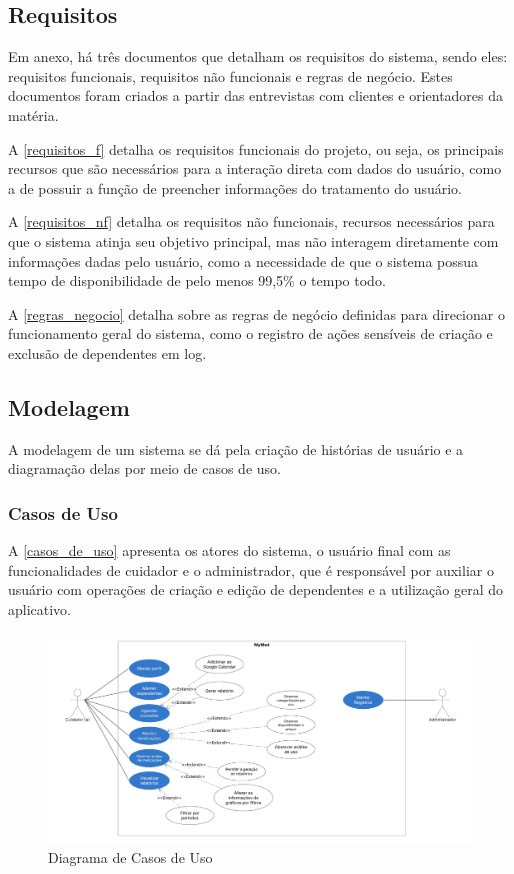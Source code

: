 \documentclass[
	article,			%
	12pt,				%
	oneside,			%
	a4paper,			%
    BIBLATEX,           %
	english,			%
	brazil,				%
	sumario=tradicional
	]{abntex2}
\begin{document}
\subsection{Requisitos}

Em anexo, há três documentos que detalham os requisitos do sistema, sendo eles: requisitos funcionais, requisitos não funcionais e regras de negócio. Estes documentos foram criados a partir das entrevistas com clientes e orientadores da matéria. 

A \autoref{requisitos_f} detalha os requisitos funcionais do projeto, ou seja, os principais recursos que são necessários para a interação direta com dados do usuário, como a de possuir a função de preencher informações do tratamento do usuário. 

A \autoref{requisitos_nf} detalha os requisitos não funcionais, recursos necessários para que o sistema atinja seu objetivo principal, mas não interagem diretamente com informações dadas pelo usuário, como a necessidade de que o sistema possua tempo de disponibilidade de pelo menos 99,5\% o tempo todo. 

A \autoref{regras_negocio} detalha sobre as regras de negócio definidas para direcionar o funcionamento geral do sistema, como o registro de ações sensíveis de criação e exclusão de dependentes em log.

\subsection{Modelagem}

A modelagem de um sistema se dá pela criação de histórias de usuário e a diagramação delas por meio de casos de uso.

\subsubsection{Casos de Uso}

A \autoref{casos_de_uso} apresenta os atores do sistema, o usuário final com as funcionalidades de cuidador e o administrador, que é responsável por auxiliar o usuário com operações de criação e edição de dependentes e a utilização geral do aplicativo.

\begin{figure}[!htbp]
    \centering
    \includegraphics[width=1.0\linewidth]{Figuras/diagrama-casos-uso.jpg}
    \caption{Diagrama de Casos de Uso}
    \label{casos_de_uso}
\end{figure}
\end{document}
